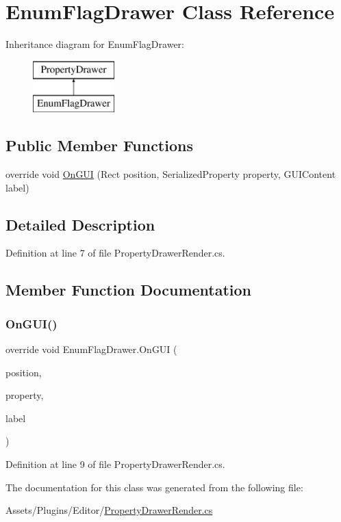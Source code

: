 \hypertarget{class_enum_flag_drawer}{}\section{Enum\+Flag\+Drawer Class Reference}
\label{class_enum_flag_drawer}
Inheritance diagram for Enum\+Flag\+Drawer\+:\begin{figure}[H]
\begin{center}
\leavevmode
\includegraphics[height=2.000000cm]{class_enum_flag_drawer}
\end{center}
\end{figure}
\subsection*{Public Member Functions}
\begin{DoxyCompactItemize}
\item 
override void \mbox{\hyperlink{class_enum_flag_drawer_ac7088cdfc18066bac79bade2d0516428}{On\+G\+UI}} (Rect position, Serialized\+Property property, G\+U\+I\+Content label)
\end{DoxyCompactItemize}


\subsection{Detailed Description}


Definition at line 7 of file Property\+Drawer\+Render.\+cs.



\subsection{Member Function Documentation}
\mbox{\label{class_enum_flag_drawer_ac7088cdfc18066bac79bade2d0516428}} 
\subsubsection{\texorpdfstring{On\+G\+U\+I()}{OnGUI()}}
{\footnotesize\ttfamily override void Enum\+Flag\+Drawer.\+On\+G\+UI (\begin{DoxyParamCaption}\item[{Rect}]{position,  }\item[{Serialized\+Property}]{property,  }\item[{G\+U\+I\+Content}]{label }\end{DoxyParamCaption})}



Definition at line 9 of file Property\+Drawer\+Render.\+cs.



The documentation for this class was generated from the following file\+:\begin{DoxyCompactItemize}
\item 
Assets/\+Plugins/\+Editor/\mbox{\hyperlink{_property_drawer_render_8cs}{Property\+Drawer\+Render.\+cs}}\end{DoxyCompactItemize}
